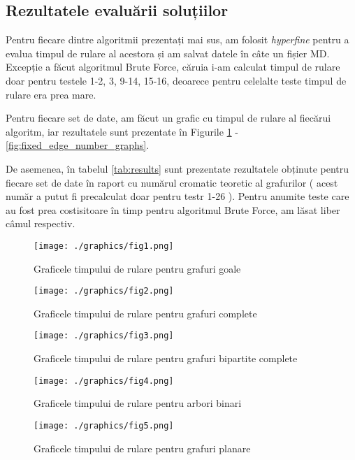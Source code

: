 \documentclass[runningheads]{paper}
\begin{document}
\subsection{Rezultatele evaluării soluțiilor}
Pentru fiecare dintre algoritmii prezentați mai sus, am folosit \textit{hyperfine}
pentru a evalua timpul de rulare al acestora și am salvat datele în câte un fișier
MD. Excepție a făcut algoritmul Brute Force, căruia i-am calculat timpul de rulare
doar pentru testele 1-2, 3, 9-14, 15-16, deoarece pentru celelalte teste timpul de
rulare era prea mare.

Pentru fiecare set de date, am făcut un grafic cu timpul de rulare al fiecărui
algoritm, iar rezultatele sunt prezentate în Figurile \ref{fig:empty_graphs} - \ref{fig:fixed_edge_number_graphs}.

De asemenea, în tabelul \ref{tab:results} sunt prezentate rezultatele obținute
pentru fiecare set de date în raport cu numărul cromatic teoretic al grafurilor (
    acest număr a putut fi precalculat doar pentru testr 1-26
).
Pentru anumite teste care au fost prea costisitoare în timp pentru algoritmul Brute Force, am
lăsat liber câmul respectiv.
\pagebreak

\begin{figure}[!]
\centering
\texttt{[image: ./graphics/fig1.png]}
\caption{Graficele timpului de rulare pentru grafuri goale}
\label{fig:empty_graphs}
\end{figure}

\begin{figure}[!]
\centering
\texttt{[image: ./graphics/fig2.png]}
\caption{Graficele timpului de rulare pentru grafuri complete}
\label{fig:complete_graphs}
\end{figure}

\begin{figure}[!]
\centering
\texttt{[image: ./graphics/fig3.png]}
\caption{Graficele timpului de rulare pentru grafuri bipartite complete}
\label{fig:bipartite_complete_graphs}
\end{figure}

\begin{figure}[!]
\centering
\texttt{[image: ./graphics/fig4.png]}
\caption{Graficele timpului de rulare pentru arbori binari}
\label{fig:binary_tree_graphs}
\end{figure}

\begin{figure}[!]
\centering
\texttt{[image: ./graphics/fig5.png]}
\caption{Graficele timpului de rulare pentru grafuri planare}
\label{fig:planar_graphs}
\end{figure}
\end{document}
